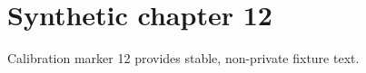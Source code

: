 \chapter{Synthetic chapter 12}\label{chap:12}
Calibration marker 12 provides stable, non-private fixture text.
